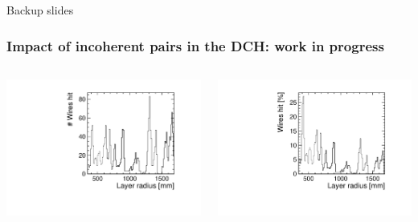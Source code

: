 \documentclass[aspectratio=169, hyperref={colorlinks=true,pdfpagelabels=false,linkcolor=black}, xcolor=dvipsnames,10pt]{beamer}
\begin{document}
\begin{frame}

	\centering
	\Huge{Backup slides}
\end{frame}

\begin{frame}
	\frametitle{Impact of incoherent pairs in the DCH: work in progress}


	\begin{columns}
	\centering
	\includegraphics[width=\textwidth]{../figures/layerR_vs_wires.pdf}

	\centering
	\includegraphics[width=\textwidth]{../figures/layerR_vs_wires_percent.pdf}	
	
	\end{columns}
	
\end{frame}
\end{document}
